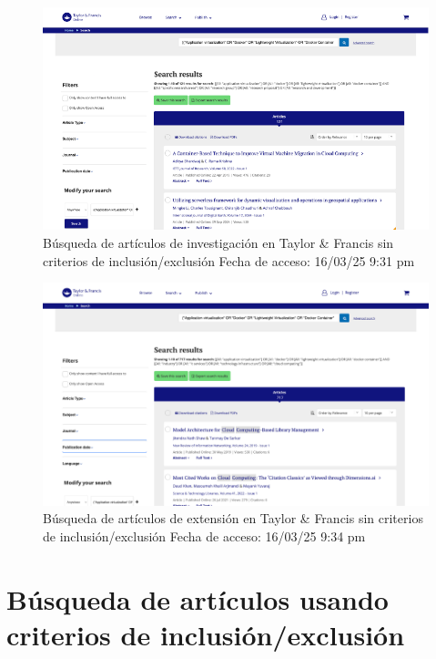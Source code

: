 \FloatBarrier\begin{figure}[htbp]
    \centering
    \includegraphics[width=\textwidth,keepaspectratio]{apendices/BD/sin-criterios/TF-inv.png}
    \caption{Búsqueda de artículos de investigación en Taylor \& Francis sin criterios de inclusión/exclusión
    Fecha de acceso: 16/03/25 9:31 pm
    }\label{fig:busqueda14}
\end{figure}
\FloatBarrier\begin{figure}[htbp]
    \centering
    \includegraphics[width=\textwidth,keepaspectratio]{apendices/BD/sin-criterios/TF-ind.png}
    \caption{Búsqueda de artículos de extensión en Taylor \& Francis sin criterios de inclusión/exclusión
    Fecha de acceso: 16/03/25 9:34 pm
    }\label{fig:busqueda15}
\end{figure}
\FloatBarrier\section*{Búsqueda de artículos usando criterios de inclusión/exclusión}
